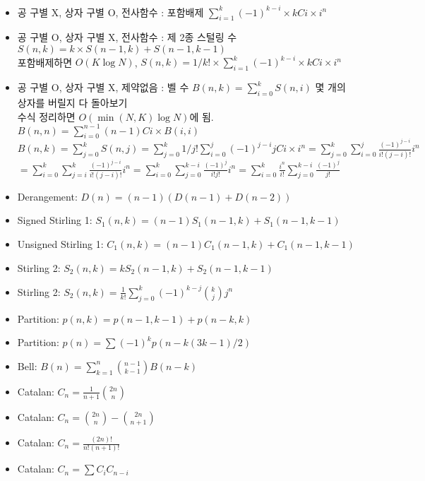 \documentclass[landscape, 8pt, a4paper, twocolumn]{extarticle} %
\begin{document}
{}{}{}{}{}
\begin{itemize}
\setlength\itemsep{0.1em}

\item 공 구별 X, 상자 구별 O, 전사함수 : 포함배제 $\sum_{i=1}^{k} (-1)^{k-i} \times kCi \times i^n$
\item 공 구별 O, 상자 구별 X, 전사함수 : 제 2종 스털링 수 $S(n,k)=k\times S(n-1,k) + S(n-1, k-1)$\\
포함배제하면 $O(K \log N)$, $S(n,k) = 1/k! \times \sum_{i=1}^{k} (-1)^{k-i} \times kCi \times i^n$
\item 공 구별 O, 상자 구별 X, 제약없음 : 벨 수 $B(n,k) = \sum_{i=0}^{k} S(n,i)$ 몇 개의 상자를 버릴지 다 돌아보기\\
수식 정리하면 $O(\min(N,K)\log N)$에 됨. $B(n,n) = \sum_{i=0}^{n-1} (n-1)Ci \times B(i,i)$\\
$B(n,k)=\sum_{j=0}^{k}S(n,j) = \sum_{j=0}^{k} 1/j! \sum_{i=0}^{j} (-1)^{j-i} jCi \times i^n=\sum_{j=0}^{k}\sum_{i=0}^{j} \frac{(-1)^{j-i}}{i!(j-i)!}i^n$\\
$=\sum_{i=0}^{k}\sum_{j=i}^{k}\frac{(-1)^{j-i}}{i!(j-i)!}i^n = \sum_{i=0}^{k}\sum_{j=0}^{k-i}\frac{(-1)^j}{i!j!}i^n = \sum_{i=0}^k \frac{i^n}{i!}\sum_{j=0}^{k-i} \frac{(-1)^j}{j!}$

\item Derangement: $D(n)=(n-1)(D(n-1)+D(n-2))$
\item Signed Stirling 1: $S_1(n,k)=(n-1)S_1(n-1,k)+S_1(n-1,k-1)$
\item Unsigned Stirling 1: $C_1(n,k)=(n-1)C_1(n-1,k)+C_1(n-1,k-1)$
\item Stirling 2: $S_2(n,k)=kS_2(n-1,k)+S_2(n-1,k-1)$
\item Stirling 2: $S_2(n,k)=\frac{1}{k!}\sum_{j=0}^{k} (-1)^{k-j}{k \choose j}j^n$
\item Partition: $p(n,k)=p(n-1,k-1) + p(n-k,k)$
\item Partition: $p(n)=\sum (-1)^kp(n-k(3k-1)/2)$
\item Bell: $B(n)=\sum_{k=1}^n {n-1\choose k-1}B(n-k)$
\item Catalan: $C_n=\frac{1}{n+1}{2n\choose n}$
\item Catalan: $C_n={2n\choose n}-{2n\choose n+1}$
\item Catalan: $C_n=\frac{(2n)!}{n!(n+1)!}$
\item Catalan: $C_n=\sum C_iC_{n-i}$

\end{itemize}
\end{document}
